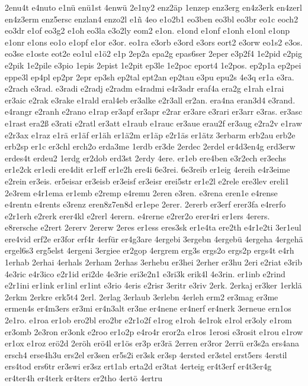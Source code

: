 {2enu4t
e4nuto
e1nü
enü1st
4enwü
2e1ny2
enz2äp
1enzep
enz3erg
en4z3erk
en4zerl
en4z3erm
enz5ersc
enzlan4
enzo2l
e1ñ
4eo
e1o2b1
eo3ben
eo3bl
eo3br
eo1c
eoch2
eo3dr
e1of
eo3g2
e1oh
eo3la
e3o2ly
eom2
e1on.
e1ond
e1onf
e1onh
e1onl
e1onp
e1onr
e1ons
eo1o
e1opf
e1or
e3or.
eo1ra
e3orb
e3ord
e3ors
eort2
e3orw
eo1s2
e3os.
eo3se
e1oste
eot2e
eo1ul
e1ö2
e1p
2ep2a
epa2g
epas6ser
2eper
e3p2f4
1e2pid
e2pig
e2pik
1e2pile
e3pio
1epis
2epist
1e2pit
ep3le
1e2poc
eport4
1e2pos.
ep2p1a
ep2pei
eppe3l
ep4pl
ep2pr
2epr
ep3sh
ep2tal
ept2an
ep2tau
e3pu
epu2s
4e3q
er1a
e3ra.
e2rach
e3rad.
e3radi
e2radj
e2radm
e4radmi
e4r3adr
eraf4a
era2g
e1rah
e1rai
er3aic
e2rak
e3rake
e1rald
eral4eb
er3alke
e2r3all
er2an.
era4na
eran3d4
e3rand.
e4rangr
e2ranh
e2rano
e1rap
er3apf
er3apr
e2rar
er3are
e3rari
er3arr
e3ras.
er3asc
e1rast
era2ß
e3rati
e2ratl
er3att
e1raub
e1rauc
er3aue
erau2f
er3aug
e2ra2v
e1raw
e2r3ax
e1raz
e1rä
er1äf
er1äh
er1ä2m
er1äp
e2r1äs
er1ätz
3erbarm
erb2au
erb2e
erb2sp
er1c
er3chl
erch2o
erda3me
1erdb
er3de
2erdec
2erdel
er4d3en4g
erd3erw
erdes4t
erdeu2
1erdg
er2dob
erd3st
2erdy
4ere.
er1eb
ere4ben
e3r2ech
er3echs
er1e2ck
er1edi
ere4dit
er1eff
er1e2h
ere4i
6e3rei.
6e3reib
er1eig
4ereih
e4r3eime
e2rein
er3eis.
er5eisar
er3eisb
er3eisf
er3eisr
erei5str
er1e2l
e2rele
ere3lev
ereli1
2e3rem
e4r1ema
er1emb
e2remp
e4remu
2eren
e3ren.
e3rena
eren1e
e4rense
e4rentn
e4rents
e3renz
eren8z7en8d
er1epe
2erer.
2ererb
er3erf
erer3fa
e4rerfo
e2r1erh
e2rerk
erer4kl
e2rerl
4erern.
e4rerne
e2rer2o
erer4ri
er1ers
4erers.
e8rersche
e2rert
2ererv
2ererw
2eres
er1ess
eres3sk
er1e4ta
ere2th
e4r1e2ti
3er1eul
ere4vid
erf2e
er3for
erf4r
4erfür
er4g3are
4ergebi
3ergebn
4ergebü
4ergeha
4ergehä
ergel6s3
erg5elst
4ergeni
3ergiee
er2gop
4ergrem
erg3s
ergs2o
ergs2p
ergs4t
e4rh
1erhab
2erhai
4erhals
2erham
2erhas
3erhebu
er3hei
2erher
er3hu
2eri
e2riat
e3rib
4e3ric
e4r3ico
e2r1id
eri2de
4e3rie
eri3e2n1
e3ri3k
erik4l
4e3rin.
er1inb
e2rind
e2r1ini
er1ink
er1inl
er1int
e3rio
4eris
e2risr
3eritr
e3riv
2erk.
2erkaj
er3ker
1erklä
2erkm
2erkre
erk5t4
2erl.
2erlag
3erlaub
3erlebn
4erleh
erm2
er3mag
er3me
ermen4s
er4m3ers
er3mi
er4n3alt
er3ne
er4nene
er4nerf
er4nerk
3erneue
ern1os
2e1ro.
e1roa
er1ob
ero2bl
ero2br
e2r1o2f
e1rog
e1roh
4e1rok
e1rol
er3oly
e1rom
er3omb
2e3ron
er3onk
e2roo
er1o2p
e4ro4r
eror2a
e1ros
1erosi
e3rosit
e1rou
e1row
er1ox
e1roz
erö2d
2eröh
erö4l
er1ös
er3p
er3rä
2erren
er3ror
2errü
er3s2a
ers4ana
ersch4
erse4h3u
ers2el
er3sen
er5s2i
er3sk
er3sp
4ersted
er3stel
erst5ers
4erstil
ers4tod
ers6tr
er3swi
er3sz
ert1ab
erta2d
er3tat
4erteig
er4t3erf
er4t3er4g
er4ter4h
er4terk
er4ters
er2tho
4ertö
4ertru
}
